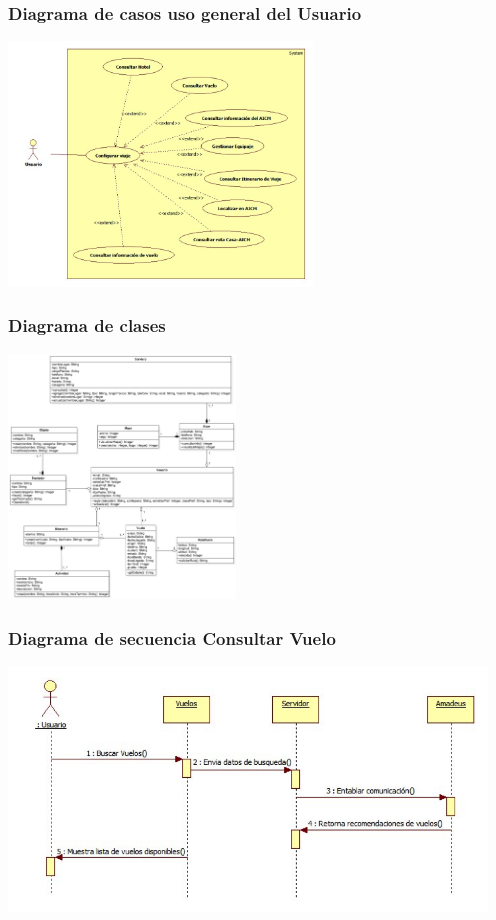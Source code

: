 \documentclass[12pt]{beamer}
\begin{document}
\begin{frame}
	\frametitle{Diagrama de casos uso general del Usuario}
	\begin{center}
		\includegraphics[height=6.5cm]{imagenes/cugeneralUsuario.png}	
	\end{center}
\end{frame}


\begin{frame}
	\frametitle{Diagrama de clases}
	\begin{center}
		\includegraphics[height=6.5cm]{imagenes/diagramaClasesMovil.png}	
	\end{center}
\end{frame}


\begin{frame}
	\frametitle{Diagrama de secuencia Consultar Vuelo}
	\begin{center}
		\includegraphics[height=6.5cm]{imagenes/secConsultarVuelo.png}	
	\end{center}
\end{frame}
\end{document}
